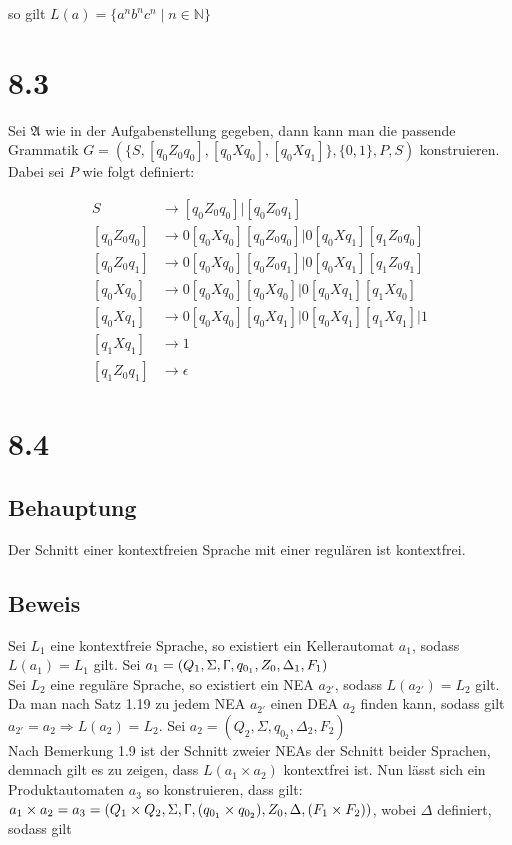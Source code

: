 \documentclass[12pt, a4paper]{article}
\begin{document}
so gilt $L(a) = \{a^n b^n c^n \mid n \in \mathbb{N} \}$
\section*{8.3}
Sei $\mathfrak{A}$ wie in der Aufgabenstellung gegeben, dann kann man die passende Grammatik $G = (\{S,[q_0Z_0q_0],[q_0Xq_0],[q_0Xq_1]\},\{0,1\},P,S)$ konstruieren. Dabei sei $P$ wie folgt definiert: 

\begin{align*}
S &\rightarrow [q_0Z_0q_0] \big| [q_0Z_0q_1]\\
[q_0Z_0q_0] &\rightarrow 0[q_0Xq_0][q_0Z_0q_0] \big| 0[q_0Xq_1][q_1Z_0q_0]\\
[q_0Z_0q_1] &\rightarrow 0[q_0Xq_0][q_0Z_0q_1] \big| 0[q_0Xq_1][q_1Z_0q_1]\\
[q_0Xq_0] &\rightarrow 0[q_0Xq_0][q_0Xq_0] \big| 0[q_0Xq_1][q_1Xq_0]\\
[q_0Xq_1] &\rightarrow 0[q_0Xq_0][q_0Xq_1] \big| 0[q_0Xq_1][q_1Xq_1] \big| 1 \\
[q_1Xq_1] &\rightarrow 1 \\
[q_1Z_0q_1] &\rightarrow \epsilon
\end{align*}


\section*{8.4}
\subsection*{Behauptung}
Der Schnitt einer kontextfreien Sprache mit einer regulären ist kontextfrei.
\subsection*{Beweis}
Sei $L_1$ eine kontextfreie Sprache, so existiert ein Kellerautomat $a_1$, sodass $L(a_1) = L_1$ gilt. Sei $a_1 = (Q_1, \Sigma, \Upgamma, q_{0_1}, Z_0, \Delta_1, F_1)$ \\
Sei $L_2$ eine reguläre Sprache, so existiert ein NEA  $a_{2'}$, sodass $L(a_{2'}) = L_2$ gilt. 
Da man nach Satz 1.19 zu jedem NEA  $a_{2'}$ einen DEA $a_2$ finden kann, sodass gilt $a_{2'} = a_2 \Rightarrow L(a_2) = L_2$. Sei $a_2 = (Q_2, \Sigma, q_{0_2}, \Delta_2, F_2)$ \\
Nach Bemerkung 1.9 ist der Schnitt zweier NEAs der Schnitt beider Sprachen, demnach gilt es zu zeigen, dass $L(a_1 \times a_2)$ kontextfrei ist. 
Nun lässt sich ein Produktautomaten $a_3$ so konstruieren, dass gilt: $a_1 \times a_2 = a_3 = (Q_1 \times Q_2, \Sigma, \Upgamma, (q_{0_1} \times q_{0_2}), Z_0, \Delta, (F_1 \times F_2))$, wobei $\Delta$ definiert, sodass gilt
\end{document}
